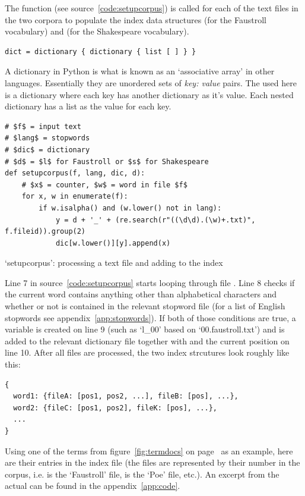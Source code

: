 The  function (see source~\ref{code:setupcorpus}) is called for each of the text files in the two corpora to populate the index data structures  (for the Faustroll vocabulary) and  (for the Shakespeare vocabulary).

\begin{verbatim}
dict = dictionary { dictionary { list [ ] } }
\end{verbatim}

A dictionary in Python is what is known as an `associative array' in other languages. Essentially they are unordered sets of \emph{key: value} pairs. The  used here is a dictionary where each key has another dictionary as it's value. Each nested dictionary has a list as the value for each key.

\begin{listing}
  \begin{verbatim}
# $f$ = input text
# $lang$ = stopwords
# $dic$ = dictionary
# $d$ = $l$ for Faustroll or $s$ for Shakespeare
def setupcorpus(f, lang, dic, d):
    # $x$ = counter, $w$ = word in file $f$
    for x, w in enumerate(f):
        if w.isalpha() and (w.lower() not in lang):
            y = d + '_' + (re.search(r"((\d\d).(\w)+.txt)", f.fileid)).group(2)
            dic[w.lower()][y].append(x)
  \end{verbatim}
\caption[`setupcorpus' function]{`setupcorpus': processing a text file and adding to the index}
\label{code:setupcorpus}
\end{listing}

Line 7 in source~\ref{code:setupcorpus} starts looping through file . Line 8 checks if the current word  contains anything other than alphabetical characters and whether or not  is contained in the relevant stopword file  (for a list of English stopwords see appendix~\ref{app:stopwords}). If both of those conditions are true, a variable  is created on line \num{9} (such as `l\_00' based on `00.faustroll.txt') and  is added to the relevant dictionary file  together with  and the current position  on line 10. After all files are processed, the two index strcutures look roughly like this:

\begin{verbatim}
{
  word1: {fileA: [pos1, pos2, ...], fileB: [pos], ...},
  word2: {fileC: [pos1, pos2], fileK: [pos], ...},
  ...
}
\end{verbatim}

Using one of the terms from figure~\ref{fig:termdocs} on page~\pageref{fig:termdocs} as an example, here are their entries in the index file (the files are represented by their number in the corpus, i.e.  is the `Faustroll' file,  is the `Poe' file, etc.). An excerpt from the actual  can be found in the appendix~\ref{app:code}.

